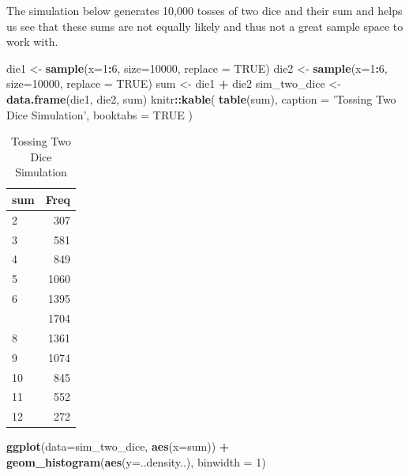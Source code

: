 \documentclass[]{book}
\newenvironment{Shaded}{\begin{snugshade}}{\end{snugshade}}
\newcommand{\KeywordTok}[1]{\textcolor[rgb]{0.13,0.29,0.53}{\textbf{#1}}}
\newcommand{\DataTypeTok}[1]{\textcolor[rgb]{0.13,0.29,0.53}{#1}}
\newcommand{\DecValTok}[1]{\textcolor[rgb]{0.00,0.00,0.81}{#1}}
\newcommand{\StringTok}[1]{\textcolor[rgb]{0.31,0.60,0.02}{#1}}
\newcommand{\OtherTok}[1]{\textcolor[rgb]{0.56,0.35,0.01}{#1}}
\newcommand{\OperatorTok}[1]{\textcolor[rgb]{0.81,0.36,0.00}{\textbf{#1}}}
\newcommand{\NormalTok}[1]{#1}
\theoremstyle{definition}
\theoremstyle{definition}
\theoremstyle{definition}
\theoremstyle{remark}
\begin{document}
The simulation below generates 10,000 tosses of two dice and their sum
and helps us see that these sums are not equally likely and thus not a
great sample space to work with.

\begin{Shaded}
\begin{Highlighting}[]
\NormalTok{die1 <-}\StringTok{ }\KeywordTok{sample}\NormalTok{(}\DataTypeTok{x=}\DecValTok{1}\OperatorTok{:}\DecValTok{6}\NormalTok{, }\DataTypeTok{size=}\DecValTok{10000}\NormalTok{, }\DataTypeTok{replace =} \OtherTok{TRUE}\NormalTok{)}
\NormalTok{die2 <-}\StringTok{ }\KeywordTok{sample}\NormalTok{(}\DataTypeTok{x=}\DecValTok{1}\OperatorTok{:}\DecValTok{6}\NormalTok{, }\DataTypeTok{size=}\DecValTok{10000}\NormalTok{, }\DataTypeTok{replace =} \OtherTok{TRUE}\NormalTok{)}
\NormalTok{sum <-}\StringTok{ }\NormalTok{die1 }\OperatorTok{+}\StringTok{ }\NormalTok{die2}
\NormalTok{sim_two_dice <-}\StringTok{ }\KeywordTok{data.frame}\NormalTok{(die1, die2, sum)}
\NormalTok{knitr}\OperatorTok{::}\KeywordTok{kable}\NormalTok{(}
  \KeywordTok{table}\NormalTok{(sum), }\DataTypeTok{caption =} \StringTok{'Tossing Two Dice Simulation'}\NormalTok{,}
  \DataTypeTok{booktabs =} \OtherTok{TRUE}
\NormalTok{)}
\end{Highlighting}
\end{Shaded}

\begin{table}

\caption{\label{tab:nice-tab-21}Tossing Two Dice Simulation}
\centering
\begin{tabular}[t]{lr}
\toprule
sum & Freq\\
\midrule
2 & 307\\
3 & 581\\
4 & 849\\
5 & 1060\\
6 & 1395\\
\addlinespace
7 & 1704\\
8 & 1361\\
9 & 1074\\
10 & 845\\
11 & 552\\
12 & 272\\
\bottomrule
\end{tabular}
\end{table}

\begin{Shaded}
\begin{Highlighting}[]
\KeywordTok{ggplot}\NormalTok{(}\DataTypeTok{data=}\NormalTok{sim_two_dice, }\KeywordTok{aes}\NormalTok{(}\DataTypeTok{x=}\NormalTok{sum)) }\OperatorTok{+}\StringTok{ }\KeywordTok{geom_histogram}\NormalTok{(}\KeywordTok{aes}\NormalTok{(}\DataTypeTok{y=}\NormalTok{..density..), }\DataTypeTok{binwidth =} \DecValTok{1}\NormalTok{)}
\end{Highlighting}
\end{Shaded}
\end{document}
